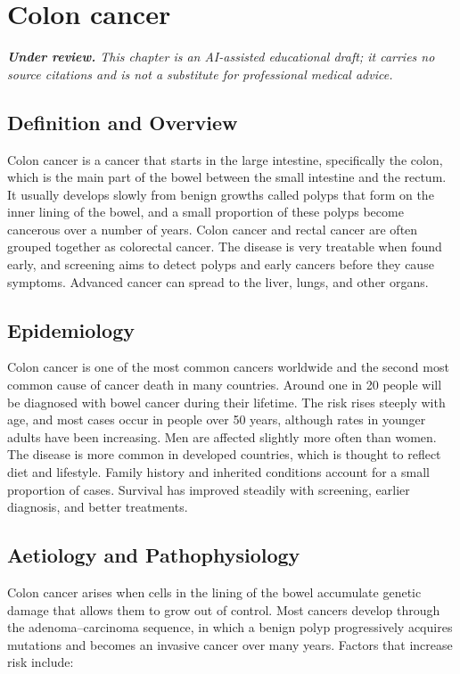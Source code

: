 \chapter{Colon cancer}

\medskip
\noindent\textit{\textbf{Under review.} This chapter is an AI-assisted educational draft; it carries no source citations and is not a substitute for professional medical advice.}

\section*{Definition and Overview}
Colon cancer is a cancer that starts in the large intestine, specifically the colon, which is the main part of the bowel between the small intestine and the rectum. It usually develops slowly from benign growths called polyps that form on the inner lining of the bowel, and a small proportion of these polyps become cancerous over a number of years. Colon cancer and rectal cancer are often grouped together as colorectal cancer. The disease is very treatable when found early, and screening aims to detect polyps and early cancers before they cause symptoms. Advanced cancer can spread to the liver, lungs, and other organs.

\section*{Epidemiology}
Colon cancer is one of the most common cancers worldwide and the second most common cause of cancer death in many countries. Around one in 20 people will be diagnosed with bowel cancer during their lifetime. The risk rises steeply with age, and most cases occur in people over 50 years, although rates in younger adults have been increasing. Men are affected slightly more often than women. The disease is more common in developed countries, which is thought to reflect diet and lifestyle. Family history and inherited conditions account for a small proportion of cases. Survival has improved steadily with screening, earlier diagnosis, and better treatments.

\section*{Aetiology and Pathophysiology}
Colon cancer arises when cells in the lining of the bowel accumulate genetic damage that allows them to grow out of control. Most cancers develop through the adenoma--carcinoma sequence, in which a benign polyp progressively acquires mutations and becomes an invasive cancer over many years. Factors that increase risk include:

